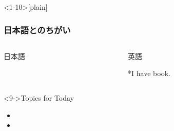 \documentclass[aspectratio=169]{beamer}
\begin{document}
\begin{frame}<1-10>[plain]\frametitle{日本語とのちがい}
\begin{columns}
\begin{column}[t]{.45\textwidth}
\begin{block}{日本語}


\end{block}
\end{column}
\begin{column}[t]{.45\textwidth}
\begin{block}{英語}


*{I have \textcolor{red!50}{book}.}
\end{block}
\end{column}
\end{columns}

\begin{exampleblock}<9->{Topics for Today}
\begin{itemize}
 \item<1->  
 \item<2->  
\end{itemize}
      \end{exampleblock}

\end{frame}
\end{document}
